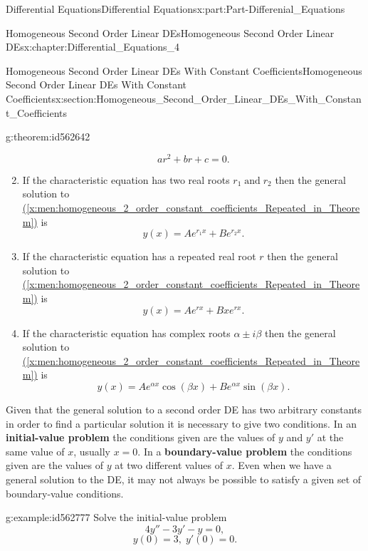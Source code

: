 \documentclass[oneside,10pt,]{book}
\newcommand{\xreffont}{\relax}
\newcommand{\terminology}[1]{\textbf{#1}}
\numberwithin{equation}{section}
\begin{document}
\begin{partptx}{Differential Equations}{}{Differential Equations}{}{}{x:part:Part-Differenial_Equations}
\begin{chapterptx}{Homogeneous Second Order Linear DEs}{}{Homogeneous Second Order Linear DEs}{}{}{x:chapter:Differential_Equations_4}
\begin{sectionptx}{Homogeneous Second Order Linear DEs With Constant Coefficients}{}{Homogeneous Second Order Linear DEs With Constant Coefficients}{}{}{x:section:Homogeneous_Second_Order_Linear_DEs_With_Constant_Coefficients}
\begin{theorem}{}{}{g:theorem:id562642}
\begin{enumerate}[label=\roman*]
\begin{equation*}
ar^{2}+br+c=0.
\end{equation*}
%
\item{}If the characteristic equation has two real roots \(r_{1}\; \text{and}\; r_{2} \) then the general solution to \hyperref[x:men:homogeneous_2_order_constant_coefficients_Repeated_in_Theorem]{({\xreffont\ref{x:men:homogeneous_2_order_constant_coefficients_Repeated_in_Theorem}})} is%
\begin{equation*}
y(x)=Ae^{r_{1}x} + Be^{r_{2}x}.
\end{equation*}
%
\item{}If the characteristic equation has a repeated real root \(r \) then the general solution to \hyperref[x:men:homogeneous_2_order_constant_coefficients_Repeated_in_Theorem]{({\xreffont\ref{x:men:homogeneous_2_order_constant_coefficients_Repeated_in_Theorem}})} is%
\begin{equation*}
y(x)=A e^{rx} + Bxe^{rx}.
\end{equation*}
%
\item{}If the characteristic equation has complex roots \(\alpha\pm i\beta \)  then the general solution to \hyperref[x:men:homogeneous_2_order_constant_coefficients_Repeated_in_Theorem]{({\xreffont\ref{x:men:homogeneous_2_order_constant_coefficients_Repeated_in_Theorem}})} is%
\begin{equation*}
y(x)=A e^{\alpha x}\cos(\beta x) + B e^{\alpha x}\sin(\beta x).
\end{equation*}
%
\end{enumerate}
%
\end{theorem}
Given that the general solution to a second order DE has two arbitrary constants in order to find a particular solution it is necessary to give two conditions. In an \terminology{initial-value problem} the conditions given are the values of \(y \) and \(y' \) at the same value of \(x \), usually \(x=0. \) In a \terminology{boundary-value problem} the conditions given are the values of \(y \) at two different values of \(x. \) Even when we have a general solution to the DE, it may not always be possible to satisfy a given set of boundary-value conditions.%
\begin{example}{}{g:example:id562777}%
Solve the initial-value problem%
\begin{equation*}
4y''-3y'-y=0, 
\end{equation*}
%
\begin{equation*}
y(0)=3,\; y'(0)=0. 
\end{equation*}

\end{example}
\end{sectionptx}
\end{chapterptx}
\end{partptx}
\end{document}
